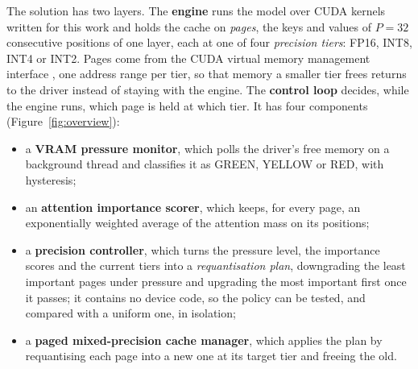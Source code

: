 \documentclass[11pt]{article}
\begin{document}
The solution has two layers. The \textbf{engine} runs the model over CUDA kernels
written for this work and holds the cache on \textit{pages}, the keys and values
of $P = 32$ consecutive positions of one layer, each at one of four
\textit{precision tiers}: FP16, INT8, INT4 or INT2. Pages come from the CUDA
virtual memory management interface \cite{cudavmm}, one address range per tier, so that memory
a smaller tier frees returns to the driver instead of staying with the engine.
The \textbf{control loop} decides, while the engine runs, which page is held at
which tier. It has four components (Figure~\ref{fig:overview}):
\begin{itemize}
\item a \textbf{VRAM pressure monitor}, which polls the driver's free memory on a
background thread and classifies it as GREEN, YELLOW or RED, with hysteresis;
\item an \textbf{attention importance scorer}, which keeps, for every page, an
exponentially weighted average of the attention mass on its positions;
\item a \textbf{precision controller}, which turns the pressure level, the
importance scores and the current tiers into a \textit{requantisation plan},
downgrading the least important pages under pressure and upgrading the most
important first once it passes; it contains no device code, so the policy can be
tested, and compared with a uniform one, in isolation;
\item a \textbf{paged mixed-precision cache manager}, which applies the plan by
requantising each page into a new one at its target tier and freeing the old.
\end{itemize}
\end{document}
